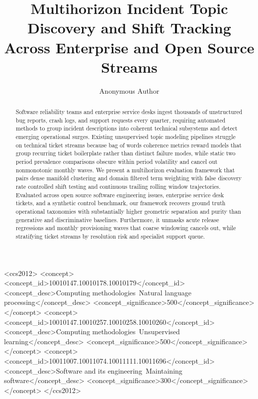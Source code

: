 \documentclass[sigconf,anonymous,pbalance]{acmart}
\begin{document}
\pagestyle{empty}

\title[Multihorizon Incident Topic Discovery]{Multihorizon Incident Topic Discovery and Shift Tracking Across Enterprise and Open Source Streams}

\author{Anonymous Author}

\begin{abstract}
Software reliability teams and enterprise service desks ingest thousands of unstructured bug reports, crash logs, and support requests every quarter, requiring automated methods to group incident descriptions into coherent technical subsystems and detect emerging operational surges. Existing unsupervised topic modeling pipelines struggle on technical ticket streams because bag of words coherence metrics reward models that group recurring ticket boilerplate rather than distinct failure modes, while static two period prevalence comparisons obscure within period volatility and cancel out nonmonotonic monthly waves. We present a multihorizon evaluation framework that pairs dense manifold clustering and domain filtered term weighting with false discovery rate controlled shift testing and continuous trailing rolling window trajectories. Evaluated across open source software engineering issues, enterprise service desk tickets, and a synthetic control benchmark, our framework recovers ground truth operational taxonomies with substantially higher geometric separation and purity than generative and discriminative baselines. Furthermore, it unmasks acute release regressions and monthly provisioning waves that coarse windowing cancels out, while stratifying ticket streams by resolution risk and specialist support queue.
\end{abstract}

\begin{CCSXML}
<ccs2012>
 <concept>
  <concept_id>10010147.10010178.10010179</concept_id>
  <concept_desc>Computing methodologies~Natural language processing</concept_desc>
  <concept_significance>500</concept_significance>
 </concept>
 <concept>
  <concept_id>10010147.10010257.10010258.10010260</concept_id>
  <concept_desc>Computing methodologies~Unsupervised learning</concept_desc>
  <concept_significance>500</concept_significance>
 </concept>
 <concept>
  <concept_id>10011007.10011074.10011111.10011696</concept_id>
  <concept_desc>Software and its engineering~Maintaining software</concept_desc>
  <concept_significance>300</concept_significance>
 </concept>
</ccs2012>
\end{CCSXML}
\end{document}
